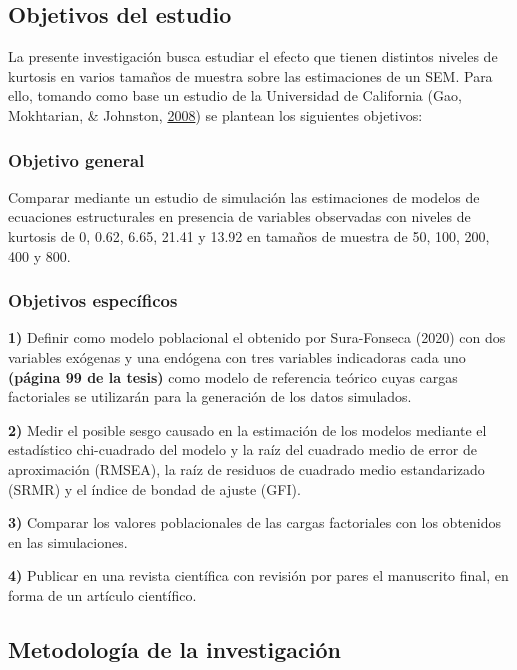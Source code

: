 \documentclass[
]{article}
\begin{document}
\subsection{Objetivos del estudio}

La presente investigación busca estudiar el efecto que tienen distintos
niveles de kurtosis en varios tamaños de muestra sobre las estimaciones
de un SEM. Para ello, tomando como base un estudio de la Universidad de
California (Gao, Mokhtarian, \& Johnston,
\protect\hyperlink{ref-gao}{2008}) se plantean los siguientes objetivos:

\subsubsection{Objetivo general}

Comparar mediante un estudio de simulación las estimaciones de modelos
de ecuaciones estructurales en presencia de variables observadas con
niveles de kurtosis de 0, 0.62, 6.65, 21.41 y 13.92 en tamaños de
muestra de 50, 100, 200, 400 y 800.

\subsubsection{Objetivos específicos}

\textbf{1)} Definir como modelo poblacional el obtenido por Sura-Fonseca
(2020) con dos variables exógenas y una endógena con tres variables
indicadoras cada uno \textbf{(página 99 de la tesis)} como modelo de
referencia teórico cuyas cargas factoriales se utilizarán para la
generación de los datos simulados.

\textbf{2)} Medir el posible sesgo causado en la estimación de los
modelos mediante el estadístico chi-cuadrado del modelo y la raíz del
cuadrado medio de error de aproximación (RMSEA), la raíz de residuos de
cuadrado medio estandarizado (SRMR) y el índice de bondad de ajuste
(GFI).

\textbf{3)} Comparar los valores poblacionales de las cargas factoriales
con los obtenidos en las simulaciones.

\textbf{4)} Publicar en una revista científica con revisión por pares el
manuscrito final, en forma de un artículo científico.

\subsection{Metodología de la investigación}
\end{document}
